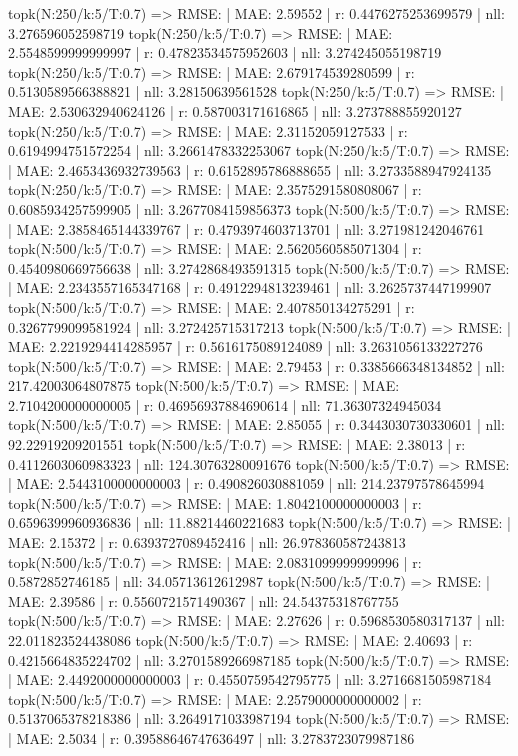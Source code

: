 topk(N:250/k:5/T:0.7) => RMSE: | MAE: 2.59552 | r: 0.4476275253699579 | nll: 3.276596052598719
topk(N:250/k:5/T:0.7) => RMSE: | MAE: 2.5548599999999997 | r: 0.47823534575952603 | nll: 3.274245055198719
topk(N:250/k:5/T:0.7) => RMSE: | MAE: 2.679174539280599 | r: 0.5130589566388821 | nll: 3.28150639561528
topk(N:250/k:5/T:0.7) => RMSE: | MAE: 2.530632940624126 | r: 0.587003171616865 | nll: 3.273788855920127
topk(N:250/k:5/T:0.7) => RMSE: | MAE: 2.31152059127533 | r: 0.6194994751572254 | nll: 3.2661478332253067
topk(N:250/k:5/T:0.7) => RMSE: | MAE: 2.4653436932739563 | r: 0.6152895786888655 | nll: 3.2733588947924135
topk(N:250/k:5/T:0.7) => RMSE: | MAE: 2.3575291580808067 | r: 0.6085934257599905 | nll: 3.2677084159856373
topk(N:500/k:5/T:0.7) => RMSE: | MAE: 2.3858465144339767 | r: 0.4793974603713701 | nll: 3.271981242046761
topk(N:500/k:5/T:0.7) => RMSE: | MAE: 2.5620560585071304 | r: 0.4540980669756638 | nll: 3.2742868493591315
topk(N:500/k:5/T:0.7) => RMSE: | MAE: 2.2343557165347168 | r: 0.4912294813239461 | nll: 3.2625737447199907
topk(N:500/k:5/T:0.7) => RMSE: | MAE: 2.407850134275291 | r: 0.3267799099581924 | nll: 3.272425715317213
topk(N:500/k:5/T:0.7) => RMSE: | MAE: 2.2219294414285957 | r: 0.5616175089124089 | nll: 3.2631056133227276
topk(N:500/k:5/T:0.7) => RMSE: | MAE: 2.79453 | r: 0.3385666348134852 | nll: 217.42003064807875
topk(N:500/k:5/T:0.7) => RMSE: | MAE: 2.7104200000000005 | r: 0.46956937884690614 | nll: 71.36307324945034
topk(N:500/k:5/T:0.7) => RMSE: | MAE: 2.85055 | r: 0.3443030730330601 | nll: 92.22919209201551
topk(N:500/k:5/T:0.7) => RMSE: | MAE: 2.38013 | r: 0.4112603060983323 | nll: 124.30763280091676
topk(N:500/k:5/T:0.7) => RMSE: | MAE: 2.5443100000000003 | r: 0.490826030881059 | nll: 214.23797578645994
topk(N:500/k:5/T:0.7) => RMSE: | MAE: 1.8042100000000003 | r: 0.6596399960936836 | nll: 11.88214460221683
topk(N:500/k:5/T:0.7) => RMSE: | MAE: 2.15372 | r: 0.6393727089452416 | nll: 26.978360587243813
topk(N:500/k:5/T:0.7) => RMSE: | MAE: 2.0831099999999996 | r: 0.5872852746185 | nll: 34.05713612612987
topk(N:500/k:5/T:0.7) => RMSE: | MAE: 2.39586 | r: 0.5560721571490367 | nll: 24.54375318767755
topk(N:500/k:5/T:0.7) => RMSE: | MAE: 2.27626 | r: 0.5968530580317137 | nll: 22.011823524438086
topk(N:500/k:5/T:0.7) => RMSE: | MAE: 2.40693 | r: 0.4215664835224702 | nll: 3.2701589266987185
topk(N:500/k:5/T:0.7) => RMSE: | MAE: 2.4492000000000003 | r: 0.4550759542795775 | nll: 3.2716681505987184
topk(N:500/k:5/T:0.7) => RMSE: | MAE: 2.2579000000000002 | r: 0.5137065378218386 | nll: 3.2649171033987194
topk(N:500/k:5/T:0.7) => RMSE: | MAE: 2.5034 | r: 0.39588646747636497 | nll: 3.2783723079987186
